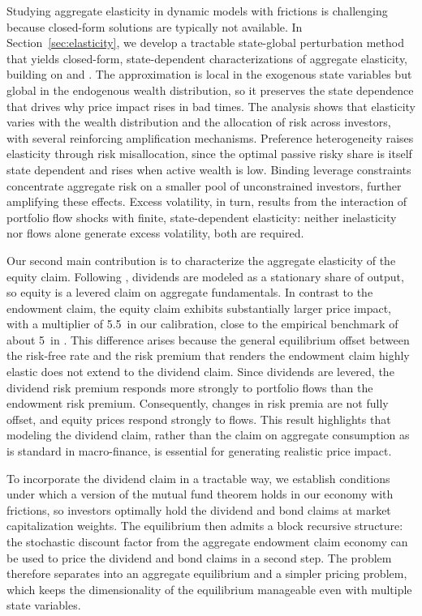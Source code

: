 \documentclass[12pt,english]{article}
\newcommand{\PIDhat}{5.5}        %
\newcommand{\PIDempirical}{5}     %
\begin{document}
Studying aggregate elasticity in dynamic models with frictions is challenging because closed-form solutions are typically not available.
In Section~\ref{sec:elasticity}, we develop a tractable state-global perturbation method that yields closed-form, state-dependent characterizations of aggregate elasticity, building on \citet{kogan2001risk} and \citet{Silva/riskchannel}.
The approximation is local in the exogenous state variables but global in the endogenous wealth distribution, so it preserves the state dependence that drives why price impact rises in bad times.
The analysis shows that elasticity varies with the wealth distribution and the allocation of risk across investors, with several reinforcing amplification mechanisms.
Preference heterogeneity raises elasticity through risk misallocation, since the optimal passive risky share is itself state dependent and rises when active wealth is low.
Binding leverage constraints concentrate aggregate risk on a smaller pool of unconstrained investors, further amplifying these effects.
Excess volatility, in turn, results from the interaction of portfolio flow shocks with finite, state-dependent elasticity: neither inelasticity nor flows alone generate excess volatility, both are required.

Our second main contribution is to characterize the aggregate elasticity of the equity claim.
Following \citet{MenzlySantosVeronesi2004}, dividends are modeled as a stationary share of output, so equity is a levered claim on aggregate fundamentals.
In contrast to the endowment claim, the equity claim exhibits substantially larger price impact, with a multiplier of \PIDhat\ in our calibration, close to the empirical benchmark of about \PIDempirical\ in \citet{gabaix2020search}.
This difference arises because the general equilibrium offset between the risk-free rate and the risk premium that renders the endowment claim highly elastic does not extend to the dividend claim.
Since dividends are levered, the dividend risk premium responds more strongly to portfolio flows than the endowment risk premium.
Consequently, changes in risk premia are not fully offset, and equity prices respond strongly to flows.
This result highlights that modeling the dividend claim, rather than the claim on aggregate consumption as is standard in macro-finance, is essential for generating realistic price impact.

To incorporate the dividend claim in a tractable way, we establish conditions under which a version of the mutual fund theorem holds in our economy with frictions, so investors optimally hold the dividend and bond claims at market capitalization weights.
The equilibrium then admits a block recursive structure: the stochastic discount factor from the aggregate endowment claim economy can be used to price the dividend and bond claims in a second step.
The problem therefore separates into an aggregate equilibrium and a simpler pricing problem, which keeps the dimensionality of the equilibrium manageable even with multiple state variables.
\end{document}
